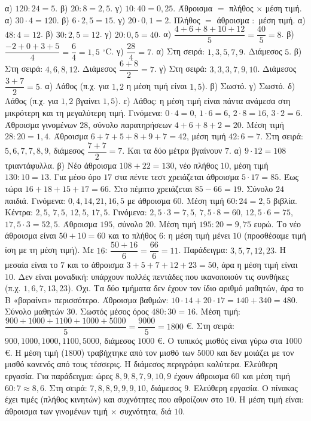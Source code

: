  α) $120:24=5$. β) $20:8=2{,}5$. γ) $10:40=0{,}25$.
 Άθροισμα $=$ πλήθος $\times$ μέση τιμή. α) $30\cdot4=120$. β) $6\cdot2{,}5=15$. γ) $20\cdot0{,}1=2$.
 Πλήθος $=$ άθροισμα $:$ μέση τιμή. α) $48:4=12$. β) $30:2{,}5=12$. γ) $20:0{,}5=40$.
 α) $\dfrac{4+6+8+10+12}{5}=\dfrac{40}{5}=8$. β) $\dfrac{-2+0+3+5}{4}=\dfrac{6}{4}=1{,}5$ $^\circ$C. γ) $\dfrac{28}{4}=7$.
 α) Στη σειρά: $1,3,5,7,9$. Διάμεσος $5$. β) Στη σειρά: $4,6,8,12$. Διάμεσος $\dfrac{6+8}{2}=7$. γ) Στη σειρά: $3,3,3,7,9,10$. Διάμεσος $\dfrac{3+7}{2}=5$.
 α) Λάθος (π.χ. για $1,2$ η μέση τιμή είναι $1{,}5$). β) Σωστό. γ) Σωστό. δ) Λάθος (π.χ. για $1,2$ βγαίνει $1{,}5$). ε) Λάθος: η μέση τιμή είναι πάντα ανάμεσα στη μικρότερη και τη μεγαλύτερη τιμή.
 Γινόμενα: $0\cdot4=0$, $1\cdot6=6$, $2\cdot8=16$, $3\cdot2=6$. Άθροισμα γινομένων $28$, σύνολο παρατηρήσεων $4+6+8+2=20$. Μέση τιμή $28:20=1{,}4$.
 Άθροισμα $6+7+5+8+9+7=42$, μέση τιμή $42:6=7$. Στη σειρά: $5,6,7,7,8,9$, διάμεσος $\dfrac{7+7}{2}=7$. Και τα δύο μέτρα βγαίνουν $7$.
 α) $9\cdot12=108$ τριαντάφυλλα. β) Νέο άθροισμα $108+22=130$, νέο πλήθος $10$, μέση τιμή $130:10=13$.
 Για μέσο όρο $17$ στα πέντε τεστ χρειάζεται άθροισμα $5\cdot17=85$. Έως τώρα $16+18+15+17=66$. Στο πέμπτο χρειάζεται $85-66=19$.
 Σύνολο $24$ παιδιά. Γινόμενα: $0,4,14,21,16,5$ με άθροισμα $60$. Μέση τιμή $60:24=2{,}5$ βιβλία.
 Κέντρα: $2{,}5$, $7{,}5$, $12{,}5$, $17{,}5$. Γινόμενα: $2{,}5\cdot3=7{,}5$, $7{,}5\cdot8=60$, $12{,}5\cdot6=75$, $17{,}5\cdot3=52{,}5$. Άθροισμα $195$, σύνολο $20$. Μέση τιμή $195:20=9{,}75$ ευρώ.
 Το νέο άθροισμα είναι $50+10=60$ και το πλήθος $6$: η μέση τιμή μένει $10$ (προσθέσαμε τιμή ίση με τη μέση τιμή). Με $16$: $\dfrac{50+16}{6}=\dfrac{66}{6}=11$.
 Παράδειγμα: $3,5,7,12,23$. Η μεσαία είναι το $7$ και το άθροισμα $3+5+7+12+23=50$, άρα η μέση τιμή είναι $10$. Δεν είναι μοναδική: υπάρχουν πολλές πεντάδες που ικανοποιούν τις συνθήκες (π.χ. $1,6,7,13,23$).
 Όχι. Τα δύο τμήματα δεν έχουν τον ίδιο αριθμό μαθητών, άρα το Β «βαραίνει» περισσότερο. Άθροισμα βαθμών: $10\cdot14+20\cdot17=140+340=480$. Σύνολο μαθητών $30$. Σωστός μέσος όρος $480:30=16$.
 Μέση τιμή: $\dfrac{900+1000+1100+1000+5000}{5}=\dfrac{9000}{5}=1800$ €. Στη σειρά: $900,1000,1000,1100,5000$, διάμεσος $1000$ €. Ο τυπικός μισθός είναι γύρω στα $1000$ €. Η μέση τιμή ($1800$) τραβήχτηκε από τον μισθό των $5000$ και δεν μοιάζει με τον μισθό κανενός από τους τέσσερις. Η διάμεσος περιγράφει καλύτερα.
 Ελεύθερη εργασία. Για παράδειγμα: ώρες $8,9,8,7,9,10,9$ έχουν άθροισμα $60$ και μέση τιμή $60:7\approx8{,}6$. Στη σειρά: $7,8,8,9,9,9,10$, διάμεσος $9$.
 Ελεύθερη εργασία. Ο πίνακας έχει τιμές (πλήθος κινητών) και συχνότητες που αθροίζουν στο $10$. Η μέση τιμή είναι: άθροισμα των γινομένων τιμή $\times$ συχνότητα, διά $10$.
